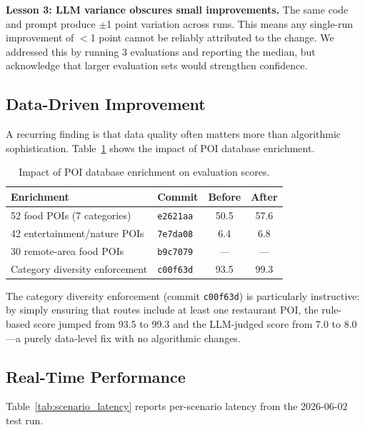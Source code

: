 \textbf{Lesson 3: LLM variance obscures small improvements.} The same code and prompt produce $\pm$1 point variation across runs. This means any single-run improvement of $<$1 point cannot be reliably attributed to the change. We addressed this by running 3 evaluations and reporting the median, but acknowledge that larger evaluation sets would strengthen confidence.

\subsection{Data-Driven Improvement}

A recurring finding is that data quality often matters more than algorithmic sophistication. Table~\ref{tab:data_improvements} shows the impact of POI database enrichment.

\begin{table}[H]
\centering
\caption{Impact of POI database enrichment on evaluation scores.}
\label{tab:data_improvements}
\begin{tabular}{@{}llcc@{}}
\toprule
\textbf{Enrichment} & \textbf{Commit} & \textbf{Before} & \textbf{After} \\
\midrule
52 food POIs (7 categories) & \texttt{e2621aa} & 50.5 & 57.6 \\
42 entertainment/nature POIs & \texttt{7e7da08} & 6.4 & 6.8 \\
30 remote-area food POIs & \texttt{b9c7079} & --- & --- \\
Category diversity enforcement & \texttt{c00f63d} & 93.5 & 99.3 \\
\bottomrule
\end{tabular}
\end{table}

The category diversity enforcement (commit \texttt{c00f63d}) is particularly instructive: by simply ensuring that routes include at least one restaurant POI, the rule-based score jumped from 93.5 to 99.3 and the LLM-judged score from 7.0 to 8.0---a purely data-level fix with no algorithmic changes.

\subsection{Real-Time Performance}

Table~\ref{tab:scenario_latency} reports per-scenario latency from the 2026-06-02 test run.

